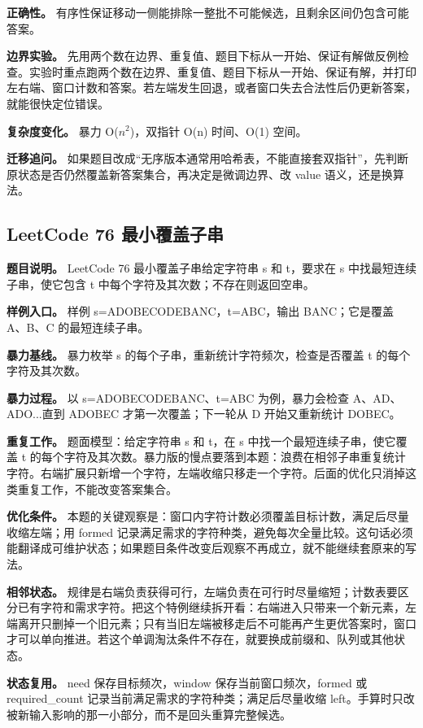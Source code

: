 \textbf{正确性。} 有序性保证移动一侧能排除一整批不可能候选，且剩余区间仍包含可能答案。

\textbf{边界实验。} 先用两个数在边界、重复值、题目下标从一开始、保证有解做反例检查。实验时重点跑两个数在边界、重复值、题目下标从一开始、保证有解，并打印左右端、窗口计数和答案。若左端发生回退，或者窗口失去合法性后仍更新答案，就能很快定位错误。

\textbf{复杂度变化。} 暴力 O(\ensuremath{n^{2}})，双指针 O(n) 时间、O(1) 空间。

\textbf{迁移追问。} 如果题目改成“无序版本通常用哈希表，不能直接套双指针”，先判断原状态是否仍然覆盖新答案集合，再决定是微调边界、改 value 语义，还是换算法。

\subsection{LeetCode 76 最小覆盖子串}

\textbf{题目说明。} LeetCode 76 最小覆盖子串给定字符串 s 和 t，要求在 s 中找最短连续子串，使它包含 t 中每个字符及其次数；不存在则返回空串。

\textbf{样例入口。} 样例 s=ADOBECODEBANC，t=ABC，输出 BANC；它是覆盖 A、B、C 的最短连续子串。

\textbf{暴力基线。} 暴力枚举 s 的每个子串，重新统计字符频次，检查是否覆盖 t 的每个字符及其次数。

\textbf{暴力过程。} 以 s=ADOBECODEBANC、t=ABC 为例，暴力会检查 A、AD、ADO...直到 ADOBEC 才第一次覆盖；下一轮从 D 开始又重新统计 DOBEC。

\textbf{重复工作。} 题面模型：给定字符串 s 和 t，在 s 中找一个最短连续子串，使它覆盖 t 的每个字符及其次数。暴力版的慢点要落到本题：浪费在相邻子串重复统计字符。右端扩展只新增一个字符，左端收缩只移走一个字符。后面的优化只消掉这类重复工作，不能改变答案集合。

\textbf{优化条件。} 本题的关键观察是：窗口内字符计数必须覆盖目标计数，满足后尽量收缩左端；用 formed 记录满足需求的字符种类，避免每次全量比较。这句话必须能翻译成可维护状态；如果题目条件改变后观察不再成立，就不能继续套原来的写法。

\textbf{相邻状态。} 规律是右端负责获得可行，左端负责在可行时尽量缩短；计数表要区分已有字符和需求字符。把这个特例继续拆开看：右端进入只带来一个新元素，左端离开只删掉一个旧元素；只有当旧左端被移走后不可能再产生更优答案时，窗口才可以单向推进。若这个单调淘汰条件不存在，就要换成前缀和、队列或其他状态。

\textbf{状态复用。} need 保存目标频次，window 保存当前窗口频次，formed 或 required\_count 记录当前满足需求的字符种类；满足后尽量收缩 left。手算时只改被新输入影响的那一小部分，而不是回头重算完整候选。

